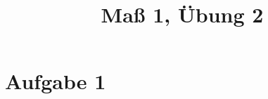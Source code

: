 \documentclass[]{article}
\author{}
\title{Maß 1, Übung 2}
\begin{document}
    \begin{titlepage}
        \maketitle
    \end{titlepage}
    
    \section{Aufgabe 1}
    

    
    
\end{document}
